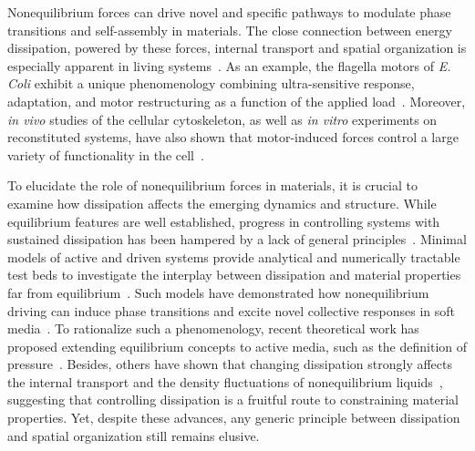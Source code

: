 \documentclass[pre, superscriptaddress, twocolumn,pre]{revtex4-1}
\begin{document}
Nonequilibrium forces can drive novel and specific pathways to modulate phase transitions and self-assembly in materials. The close connection between energy dissipation, powered by these forces, internal transport and spatial organization is especially apparent in living systems~\cite{Toyabe2010, Ahmed2016, Battle604, Mura2018}. As an example, the flagella motors of {\it E. Coli} exhibit a unique phenomenology combining ultra-sensitive response, adaptation, and motor restructuring as a function of the applied load~\cite{Lele2013, Lan2012, Wang2017}. Moreover, {\it in vivo} studies of the cellular cytoskeleton, as well as {\it in vitro} experiments on reconstituted systems, have also shown that motor-induced forces control a large variety of functionality in the cell~\cite{Silva2011, Sanchez2012, Blanchoin2014, Murrell2015, Decamp2015}.


To elucidate the role of nonequilibrium forces in materials, it is crucial to examine how dissipation affects the emerging dynamics and structure. While equilibrium features are well established, progress in controlling systems with sustained dissipation has been hampered by a lack of general principles~\cite{Cates2015, Solon2015a, Nguyen2016, Fodor2016, Murugan2017, Nardini2017, Nguyen2018}. Minimal models of active and driven systems provide analytical and numerically tractable test beds to investigate the interplay between dissipation and material properties far from equilibrium~\cite{Marchetti2013, Han2016, Bechinger2016, delJunco2018, Marchetti2018}. Such models have demonstrated how nonequilibrium driving can induce phase transitions and excite novel collective responses in soft media~\cite{Vicsek1995, Tailleur2008, Han2016, Nguyen2016, VanZuiden2016}. To rationalize such a phenomenology, recent theoretical work has proposed extending equilibrium concepts to active media, such as the definition of pressure~\cite{Takatori2015, Solon2015a, Solon2015b}. Besides, others have shown that changing dissipation strongly affects the internal transport and the density fluctuations of nonequilibrium liquids~\cite{Cagnetta2017, delJunco2018, nemoto2018optimizing}, suggesting that controlling dissipation is a fruitful route to constraining material properties. Yet, despite these advances, any generic principle between dissipation and spatial organization still remains elusive.
\end{document}
